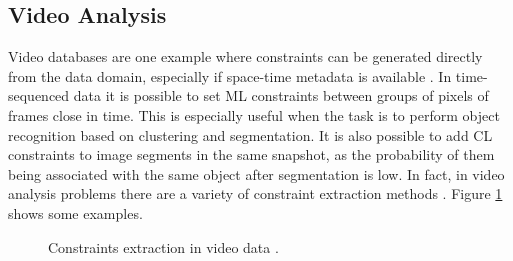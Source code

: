 \subsection{Video Analysis}

Video databases are one example where constraints can be generated directly from the data domain, especially if space-time metadata is available \cite{yan2006discriminative}. In time-sequenced data it is possible to set \acs{ML} constraints between groups of pixels of frames close in time. This is especially useful when the task is to perform object recognition based on clustering and segmentation. It is also possible to add \acs{CL} constraints to image segments in the same snapshot, as the probability of them being associated with the same object after segmentation is low. In fact, in video analysis problems there are a variety of constraint extraction methods \cite{yan2006discriminative}. Figure \ref{fig:ConstExtractionVideo} shows some examples. 

\begin{figure}[bth]
	\myfloatalign
	\quad
	 \quad
	\quad
	\caption[Constraints extraction in video data.]{Constraints extraction in video data \cite{yan2006discriminative,davidson2007survey}.}\label{fig:ConstExtractionVideo}
\end{figure}

